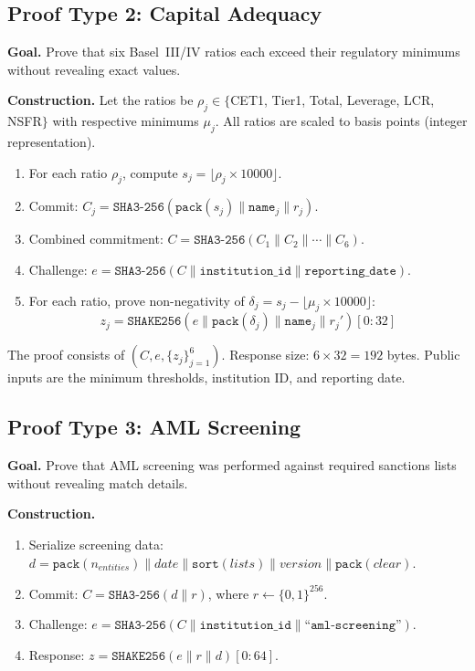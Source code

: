 \documentclass[conference,10pt]{IEEEtran}
\newcommand{\SHAKE}{\texttt{SHAKE256}}
\newcommand{\SHA}{\texttt{SHA3-256}}
\begin{document}
\subsection{Proof Type 2: Capital Adequacy}

\textbf{Goal.} Prove that six Basel~III/IV ratios each exceed their regulatory minimums without revealing exact values.

\textbf{Construction.} Let the ratios be $\rho_j \in \{$CET1, Tier1, Total, Leverage, LCR, NSFR$\}$ with respective minimums $\mu_j$. All ratios are scaled to basis points (integer representation).

\begin{enumerate}
\item For each ratio $\rho_j$, compute $s_j = \lfloor \rho_j \times 10000 \rfloor$.
\item Commit: $C_j = \SHA(\texttt{pack}(s_j) \| \texttt{name}_j \| r_j)$.
\item Combined commitment: $C = \SHA(C_1 \| C_2 \| \cdots \| C_6)$.
\item Challenge: $e = \SHA(C \| \texttt{institution\_id} \| \texttt{reporting\_date})$.
\item For each ratio, prove non-negativity of $\delta_j = s_j - \lfloor \mu_j \times 10000 \rfloor$:
\begin{equation}
z_j = \SHAKE(e \| \texttt{pack}(\delta_j) \| \texttt{name}_j \| r_j')[0{:}32]
\end{equation}
\end{enumerate}

The proof consists of $(C, e, \{z_j\}_{j=1}^{6})$. Response size: $6 \times 32 = 192$ bytes. Public inputs are the minimum thresholds, institution ID, and reporting date.

\subsection{Proof Type 3: AML Screening}

\textbf{Goal.} Prove that AML screening was performed against required sanctions lists without revealing match details.

\textbf{Construction.}
\begin{enumerate}
\item Serialize screening data: $d = \texttt{pack}(n_{entities}) \| date \| \texttt{sort}(lists) \| version \| \texttt{pack}(clear)$.
\item Commit: $C = \SHA(d \| r)$, where $r \leftarrow \{0,1\}^{256}$.
\item Challenge: $e = \SHA(C \| \texttt{institution\_id} \| \texttt{``aml-screening''})$.
\item Response: $z = \SHAKE(e \| r \| d)[0{:}64]$.
\end{enumerate}
\end{document}

